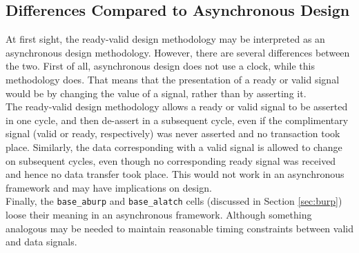 \subsection{Differences Compared to Asynchronous Design}
At first sight, the ready-valid design methodology may be interpreted as an asynchronous design methodology. However, there are several differences between the two. First of all, asynchronous design does not use a clock, while this methodology does. That means that the presentation of a ready or valid signal would be by changing the value of a signal, rather than by asserting it.\\
The ready-valid design methodology allows a ready or valid signal to be asserted in one cycle, and then de-assert in a subsequent cycle, even if the complimentary signal (valid or ready, respectively) was never asserted and no transaction took place. Similarly, the data corresponding with a valid signal is allowed to change on subsequent cycles, even though no corresponding ready signal was received and hence no data transfer took place. This would not work in an asynchronous framework and may have implications on design.\\
Finally, the \texttt{base\_aburp} and \texttt{base\_alatch} cells (discussed in Section \ref{sec:burp}) loose their meaning in an asynchronous framework. Although something analogous may be needed to maintain reasonable timing constraints between valid and data signals. 





